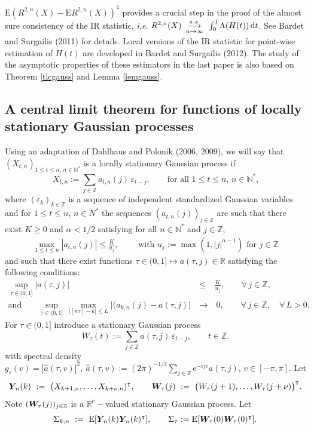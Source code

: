 \documentclass[10pt]{article}
\def\N{\mathbb{N}}
\def\R{\mathbb{R}}
\def\Z{\mathbb{Z}}
\def\i{\mathrm i}
\def\d{\mathrm d}
\def\e{\mathrm e}
\def\E{\mathrm E}
\newcommand{\mbf}[1]{\mbox{\boldmath $#1$}}
\def\limitepsn{\renewcommand{\arraystretch}{0.5}
\begin{array}[t]{c}
\stackrel{a.s.}{\longrightarrow} \\
{\scriptstyle n\rightarrow\infty}
\end{array}\renewcommand{\arraystretch}{1}}
\begin{document}
$\E (R^{2,n} (X) - \E R^{2,n} (X))^4 $
provides a crucial step in the proof of the almost sure consistency of the IR statistic, {\it i.e.} $ R^{2,n} (X) \limitepsn \int_0^1 \Lambda(H(t))\, \d t$. See Bardet and Surgailis (2011) for details. Local versions of the IR statistic for point-wise estimation of $H(t)$ are
developed in Bardet and Surgailis (2012). The study of  the asymptotic properties of these estimators in the last paper  is also based on %
Theorem \ref{tlcgauss} and  Lemma \ref{lemgauss}.



\subsection{A central limit theorem for functions of locally stationary Gaussian processes}

Using an adaptation of Dahlhaus and Polonik (2006, 2009), we will say that $(X_{t,n})_{1\leq t \leq n,\,n \in \N^*}$ is a locally stationary Gaussian process if
\begin{equation} \label{local}
X_{t,n}:=\sum_{j\in \Z} a_{t,n}(j)\, \varepsilon_{t-j}, %
\qquad \mbox{for all $1\leq t \leq n,\, n\in \N^*$,}
\end{equation}
where $(\varepsilon_k)_{k\in \Z}$ is a sequence of independent standardized Gaussian variables and for $1\leq t\leq n$, $n\in N^*$ the sequences $(a_{t,n}(j))_{j\in \Z}$ are such that there exist $K\geq 0$ and $\alpha< 1/2$ satisfying for all $n\in \N^*$ and $j\in \Z$,
\begin{eqnarray}\label{condi1}
\max_{1\leq t\leq n} |a_{t,n}(j)|\leq \frac K {u_j},\qquad \mbox{ with \ $u_j:=\max (1,|j|^{\alpha-1})$ \ for $j \in \Z$}
\end{eqnarray} 
and such that there exist functions $\tau \in (0,1] \mapsto a(\tau,j)\in \R$ satisfying
the following conditions:
\begin{eqnarray}\label{conda}
\sup_{\tau \in (0,1]}|a(\tau,j)|&\leq&  \frac K {u_j}, \qquad \forall \, j \in \Z,\\
\label{cond3} \mbox{and}\qquad \sup_{\tau \in (0,1]}\, \max_{|[n \tau] - k| \le L} |(a_{k,n}(j) - a(\tau, j)\big|  \ &\to & \ 0,
\qquad \forall \, j \in \Z, \quad \forall \, L >0. 
\end{eqnarray}
For $\tau \in (0,1]$
introduce a stationary  Gaussian process
$$
W_{\tau}(t):= \sum_{j\in \Z} a(\tau,j)\, \varepsilon_{t-j}, \qquad t \in \Z.
$$
with spectral density $g_\tau(v) = |\hat a(\tau,v)|^2, \ \hat a(\tau, v) :=  (2\pi)^{-1/2} \sum_{j \in \Z} \e^{- \i j v} a(\tau, j), \,
v \in [-\pi, \pi]$. Let
$$
{\mbf Y}_{\!n}(k)\ :=\  \big (X_{k+1,n},\dots,X_{k+\nu,n})^\intercal, \qquad {\mbf W}_{\!\tau}(j)\ := \ \big (W_{\tau}(j+1),\dots, W_{\tau}(j+\nu) \big)^\intercal.
$$
Note $({\mbf W}_{\!\tau}(j))_{j \in \Z} $ is a $\R^\nu-$valued stationary Gaussian process. Let
$$
\Sigma_{k,n}\ := \  \E [ {\mbf Y}_{\! n}(k) {\mbf Y}_{\! n}(k)^\intercal], \qquad
\Sigma_\tau :=  \E [{\mbf W}_{\!\tau}(0) {\mbf W}_{\!\tau}(0)^\intercal ].
$$
\end{document}
